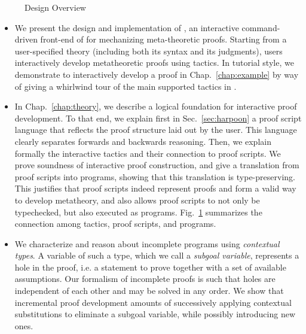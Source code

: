 \begin{figure}[t]
  \centering
  
  \caption{\Harpoon{} Design Overview}
  \label{fig:harpoon}
\end{figure}

\begin{itemize}
\item
  We present the design and implementation of \Harpoon, an
  interactive command-driven front-end of \Beluga{} for mechanizing
  meta-theoretic proofs.
  Starting from a user-specified theory (including both its syntax and its
  judgments), users interactively develop metatheoretic proofs using tactics.
  In tutorial style, we demonstrate \Harpoon{} to interactively
  develop a proof in Chap.~\ref{chap:example} by way of giving a whirlwind tour of
  the main supported tactics in \Harpoon.

\item
  In Chap.~\ref{chap:theory}, we describe a logical foundation for interactive
  proof development. To that end, we explain first in Sec.~\ref{sec:harpoon} a
  proof script language that reflects the proof structure laid out by the
  user. This language clearly separates forwards and backwards reasoning.
  Then, we explain formally the interactive tactics and their connection to proof
  scripts. We prove soundness of interactive proof construction, and give a
  translation from proof scripts into \Beluga{} programs, showing that this
  translation is type-preserving.
  This justifies that proof scripts indeed represent proofs and form a valid way
  to develop metatheory, and also allows proof scripts to not only be
  typechecked, but also executed as programs.
  Fig.~\ref{fig:harpoon} summarizes the connection among tactics, proof
  scripts, and \Beluga{} programs.

\item
  We characterize and reason about incomplete programs using
  \emph{contextual types}.
  A variable of such a type, which we call a \emph{subgoal variable}, represents a
  hole in the proof, i.e. a statement to prove together with a set of available
  assumptions.
  Our formalism of incomplete proofs is such that holes are independent of each
  other and may be solved in any order.
  We show that incremental proof development amounts of successively applying
  contextual substitutions to eliminate a subgoal variable, while possibly
  introducing new ones.


\end{itemize}
